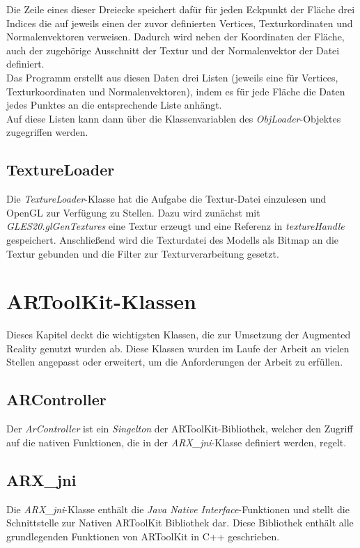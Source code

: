 Die Zeile eines dieser Dreiecke speichert dafür für jeden Eckpunkt der Fläche drei Indices die auf jeweils einen der  zuvor definierten Vertices, Texturkordinaten und Normalenvektoren verweisen. Dadurch wird neben der Koordinaten der Fläche, auch der zugehörige Ausschnitt der Textur und der Normalenvektor der Datei definiert. \\
Das Programm erstellt aus diesen Daten drei Listen (jeweils eine für Vertices, Texturkoordinaten und Normalenvektoren), indem es für jede Fläche die Daten jedes Punktes an die entsprechende Liste anhängt.\\
Auf diese Listen kann dann über die Klassenvariablen des \textit{ObjLoader}-Objektes zugegriffen werden.

\subsection{TextureLoader}\label{class:textureloader}
Die \textit{TextureLoader}-Klasse hat die Aufgabe die Textur-Datei einzulesen und OpenGL zur Verfügung zu Stellen. Dazu wird zunächst mit \textit{GLES20.glGenTextures} eine Textur erzeugt und eine Referenz in \textit{textureHandle} gespeichert. Anschließend wird die Texturdatei des Modells als Bitmap an die Textur gebunden und die Filter zur Texturverarbeitung gesetzt. 

\section{ARToolKit-Klassen}
Dieses Kapitel deckt die wichtigsten Klassen, die zur Umsetzung der Augmented Reality genutzt wurden ab. Diese Klassen wurden im Laufe der Arbeit an vielen Stellen angepasst oder erweitert, um die Anforderungen der Arbeit zu erfüllen.

\subsection{ARController}
Der \textit{ArController} ist ein \textit{Singelton} der ARToolKit-Bibliothek, welcher den Zugriff auf die nativen Funktionen, die in der \textit{ARX\_jni}-Klasse definiert werden, regelt. \\

\subsection{ARX\_jni}
Die \textit{ARX\_jni}-Klasse enthält die \textit{Java Native Interface}-Funktionen und stellt die Schnittstelle zur Nativen ARToolKit Bibliothek dar. Diese Bibliothek enthält alle grundlegenden Funktionen von ARToolKit in C++ geschrieben.

